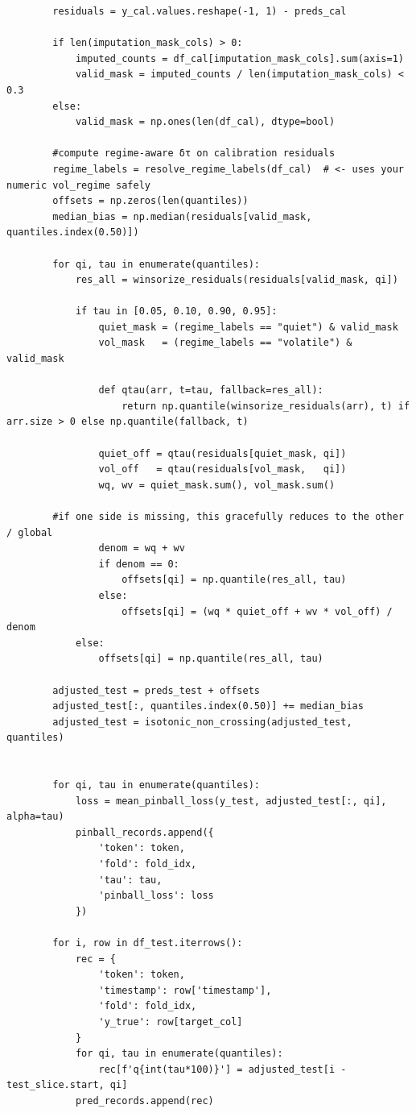 \documentclass[
  a4paper,
  DIV=11,
  numbers=noendperiod]{scrreprt}
\begin{document}
\begin{verbatim}
        residuals = y_cal.values.reshape(-1, 1) - preds_cal

        if len(imputation_mask_cols) > 0:
            imputed_counts = df_cal[imputation_mask_cols].sum(axis=1)
            valid_mask = imputed_counts / len(imputation_mask_cols) < 0.3
        else:
            valid_mask = np.ones(len(df_cal), dtype=bool)

        #compute regime-aware δτ on calibration residuals 
        regime_labels = resolve_regime_labels(df_cal)  # <- uses your numeric vol_regime safely
        offsets = np.zeros(len(quantiles))
        median_bias = np.median(residuals[valid_mask, quantiles.index(0.50)])

        for qi, tau in enumerate(quantiles):
            res_all = winsorize_residuals(residuals[valid_mask, qi])

            if tau in [0.05, 0.10, 0.90, 0.95]:
                quiet_mask = (regime_labels == "quiet") & valid_mask
                vol_mask   = (regime_labels == "volatile") & valid_mask

                def qtau(arr, t=tau, fallback=res_all):
                    return np.quantile(winsorize_residuals(arr), t) if arr.size > 0 else np.quantile(fallback, t)

                quiet_off = qtau(residuals[quiet_mask, qi])
                vol_off   = qtau(residuals[vol_mask,   qi])
                wq, wv = quiet_mask.sum(), vol_mask.sum()

        #if one side is missing, this gracefully reduces to the other / global
                denom = wq + wv
                if denom == 0:
                    offsets[qi] = np.quantile(res_all, tau)
                else:
                    offsets[qi] = (wq * quiet_off + wv * vol_off) / denom
            else:
                offsets[qi] = np.quantile(res_all, tau)

        adjusted_test = preds_test + offsets
        adjusted_test[:, quantiles.index(0.50)] += median_bias
        adjusted_test = isotonic_non_crossing(adjusted_test, quantiles)


        for qi, tau in enumerate(quantiles):
            loss = mean_pinball_loss(y_test, adjusted_test[:, qi], alpha=tau)
            pinball_records.append({
                'token': token,
                'fold': fold_idx,
                'tau': tau,
                'pinball_loss': loss
            })

        for i, row in df_test.iterrows():
            rec = {
                'token': token,
                'timestamp': row['timestamp'],
                'fold': fold_idx,
                'y_true': row[target_col]
            }
            for qi, tau in enumerate(quantiles):
                rec[f'q{int(tau*100)}'] = adjusted_test[i - test_slice.start, qi]
            pred_records.append(rec)


\end{verbatim}
\end{document}

